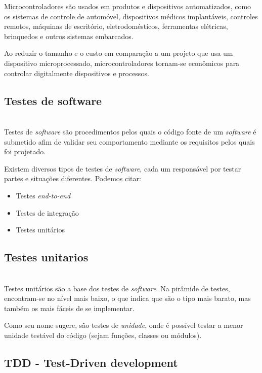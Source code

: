\documentclass[times, twoside, watermark]{artigo}
\begin{document}
Microcontroladores são usados em produtos e dispositivos automatizados, como os 
sistemas de controle de automóvel, dispositivos médicos implantáveis,
controles remotos, máquinas de escritório, eletrodomésticos, ferramentas elétricas,
brinquedos e outros sistemas embarcados.

Ao reduzir o tamanho e o custo em comparação a um projeto que usa um dispositivo 
microprocessado, microcontroladores tornam-se econômicos para controlar
digitalmente dispositivos e processos\cite{gridling2007introduction}.

\subsection{Testes de software}\hfill\\
Testes de \textit{software} são procedimentos pelos quais o código fonte de um
\textit{software} é submetido afim de validar seu comportamento mediante
os requisitos pelos quais foi projetado.

Existem diversos tipos de testes de \textit{software}, cada um responsável por 
testar partes e situações diferentes. Podemos citar:

\begin{itemize}
\item Testes \textit{end-to-end}
\item Testes de integração
\item Testes unitários
\end{itemize}

\subsection{Testes unitarios}\hfill\\

Testes unitários são a base dos testes de \textit{software}. Na pirâmide de testes,
encontram-se no nível mais baixo, o que indica que são o tipo mais barato, mas
também os mais fáceis de se implementar\cite{8402699}.

Como seu nome sugere, são testes de \textit{unidade}, onde é possível testar a 
menor unidade testável do código (sejam funções, classes ou módulos).

\subsection{TDD - Test-Driven development}\hfill\\
\end{document}

